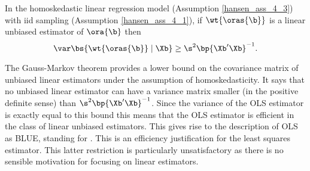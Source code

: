 \begin{theorem}
    \label{hansen_thm_4_4}

    In the homoskedastic linear regression model (Assumption \ref{hansen_ass_4_3}) with iid sampling (Assumption \ref{hansen_ass_4_1}), if $\wt{\oras{\b}}$ is a linear unbiased estimator of $\ora{\b}$ then 
    \begin{equation}
        \notag
        \var\bs{\wt{\oras{\b}} \mid \Xb} \geq \s^2 \bp{\Xb^\prime \Xb}^{-1}.
    \end{equation}
\end{theorem}

The Gauss-Markov theorem provides a lower bound on the covariance matrix of unbiased linear estimators under the assumption of homoskedasticity. It says that no unbiased linear estimator can have a variance matrix smaller (in the positive definite sense) than $\s^2 \bp{\Xb^\prime \Xb}^{-1}$. Since the variance of the OLS estimator is exactly equal to this bound this means that the OLS estimator is efficient in the class of linear unbiased estimators. This gives rise to the description of OLS as BLUE, standing for . This is an efficiency justification for the least squares estimator.  This latter restriction is particularly unsatisfactory as there is no sensible motivation for focusing on linear estimators.

